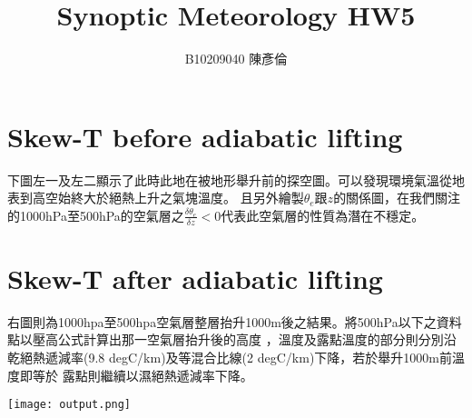 \documentclass{article}
\title{\Huge Synoptic Meteorology HW5}
\author{B10209040 陳彥倫}
\begin{document}
\begin{CJK*}{UTF8}{bsmi}
\maketitle


\section{Skew-T before adiabatic lifting}
\begin{spacing}{1.5}
下圖左一及左二顯示了此時此地在被地形舉升前的探空圖。可以發現環境氣溫從地表到高空始終大於絕熱上升之氣塊溫度。
且另外繪製$\theta_e$跟$z$的關係圖，在我們關注的1000hPa至500hPa的空氣層之$\frac{\delta\theta_e}{\delta z}
<0$代表此空氣層的性質為潛在不穩定。
\end{spacing}


\section{Skew-T after adiabatic lifting}
\begin{spacing}{1.5}
右圖則為1000hpa至500hpa空氣層整層抬升1000m後之結果。將500hPa以下之資料點以壓高公式計算出那一空氣層抬升後的高度
，溫度及露點溫度的部分則分別沿乾絕熱遞減率(9.8 degC/km)及等混合比線(2 degC/km)下降，若於舉升1000m前溫度即等於
露點則繼續以濕絕熱遞減率下降。
\end{spacing}


\texttt{[image: output.png]}


\end{CJK*}
\end{document}
